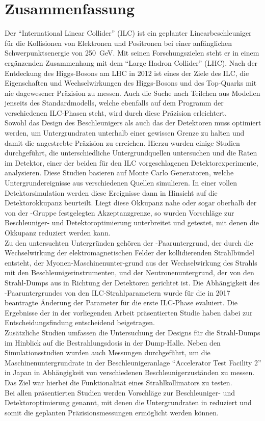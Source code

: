 \chapter*{Zusammenfassung}
Der ``International Linear Collider'' (ILC) ist ein geplanter Linearbeschleuniger f\"ur die Kollisionen von Elektronen und Positronen bei einer anf\"anglichen Schwerpunktsenergie von \SI{250}{\GeV}.
Mit seinen Forschungszielen steht er in einem erg\"anzenden Zusammenhang mit dem ``Large Hadron Collider'' (LHC).
Nach der Entdeckung des Higgs-Bosons am LHC in 2012 ist eines der Ziele des ILC, die Eigenschaften und Wechselwirkungen des Higgs-Bosons und des Top-Quarks mit nie dagewesener Präzision zu messen.
Auch die Suche nach Teilchen aus Modellen jenseits des Standardmodells, welche ebenfalls auf dem Programm der verschiedenen ILC-Phasen steht, wird durch diese Präzision erleichtert.
\\Sowohl das Design des Beschleunigers als auch das der Detektoren muss optimiert werden, um Untergrundraten unterhalb einer gewissen Grenze zu halten und damit die angestrebte Pr\"azision zu erreichen.
Hierzu wurden einige Studien durchgeführt, die unterschiedliche Untergrundquellen untersuchen und die Raten im \sid Detektor, einer der beiden f\"ur den ILC vorgeschlagenen Detektorexperimente, analysieren.
Diese Studien basieren auf Monte Carlo Generatoren, welche Untergrundereignisse aus verschiedenen Quellen simulieren.
In einer vollen Detektorsimulation werden diese Ereignisse dann in Hinsicht auf die \sid Detektorokkupanz beurteilt.
Liegt diese Okkupanz nahe oder sogar oberhalb der von der \sid-Gruppe festgelegten Akzeptanzgrenze, so wurden Vorschläge zur Beschleuniger- und Detektoroptimierung unterbreitet und getestet, mit denen die Okkupanz reduziert werden kann.
\\Zu den untersuchten Untergründen gehören der \positron\electron-Paaruntergrund, der durch die Wechselwirkung der elektromagnetischen Felder der kollidierenden Strahlb\"undel entsteht, der Myonen-Maschinenunter-grund aus der Wechselwirkung des Strahls mit den Beschleunigerinstrumenten, und der Neutronenuntergrund, der von den Strahl-Dumps aus in Richtung der Detektoren gerichtet ist.
Die Abhängigkeit des \positron\electron-Paaruntergrundes von den ILC-Strahlparametern wurde f\"ur die in 2017 beantragte Änderung der Parameter f\"ur die erste ILC-Phase evaluiert.
Die Ergebnisse der in der vorliegenden Arbeit präsentierten Studie haben dabei zur Entscheidungsfindung entscheidend beigetragen.
\\Zusätzliche Studien umfassen die Untersuchung der Designs f\"ur die Strahl-Dumps im Hinblick auf die Bestrahlungsdosis in der Dump-Halle.
Neben den Simulationsstudien wurden auch Messungen durchgeführt, um die Maschinenuntergrundrate in der Beschleunigeranlage ``Accelerator Test Facility 2'' in Japan in Abhängigkeit von verschiedenen Beschleunigerzust\"anden zu messen.
Das Ziel war hierbei die Funktionalität eines Strahlkollimators zu testen.
\\Bei allen präsentierten Studien werden Vorschläge zur Beschleuniger- und Detektoroptimierung genannt, mit denen die Untergrundraten in \sid reduziert und somit die geplanten Pr\"azisionsmessungen ermöglicht werden können.